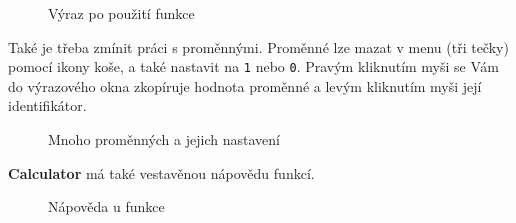 \documentclass[a4paper, 11pt]{article}
\begin{document}
\begin{figure}[H]
    \centering
    \caption{Výraz po použití funkce}
\end{figure}

Také je třeba zmínit práci s proměnnými. Proměnné lze mazat v menu (tři
tečky) pomocí ikony koše, a také nastavit na \texttt{1} nebo \texttt{0}.
Pravým kliknutím myši se Vám do výrazového okna zkopíruje hodnota
proměnné a levým kliknutím myši její identifikátor.

\begin{figure}[H]
    \centering
    \caption{Mnoho proměnných a jejich nastavení}
\end{figure}

\noindent
\textbf{Calculator} má také vestavěnou nápovědu funkcí.

\begin{figure}[H]
    \centering
    \caption{Nápověda u funkce}
\end{figure}
\end{document}
